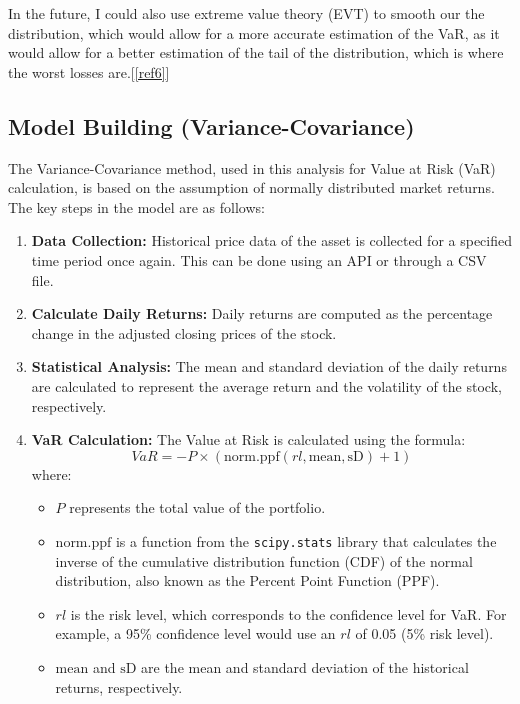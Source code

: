 \documentclass{article}
\begin{document}
In the future, I could also use extreme value theory (EVT) to smooth our the distribution, which would allow for a more accurate estimation of the VaR, as it would allow for a better estimation of the tail of the distribution, which is where the worst losses are.[\ref{ref6}]\\\vspace{0.3cm}

\subsection{Model Building (Variance-Covariance)}

The Variance-Covariance method, used in this analysis for Value at Risk (VaR) calculation, is based on the assumption of normally distributed market returns. The key steps in the model are as follows:

\begin{enumerate}
    \item \textbf{Data Collection:} Historical price data of the asset is collected for a specified time period once again. This can be done using an API or through a CSV file.
    \item \textbf{Calculate Daily Returns:} Daily returns are computed as the percentage change in the adjusted closing prices of the stock.
    \item \textbf{Statistical Analysis:} The mean and standard deviation of the daily returns are calculated to represent the average return and the volatility of the stock, respectively.
    \item \textbf{VaR Calculation:} The Value at Risk is calculated using the formula:
    \begin{equation}
      VaR = - P \times (\text{norm.ppf}(rl, \text{mean}, \text{sD}) + 1) 
      \label{eq:Variance-Covariance VaR}
    \end{equation}
    where:
\begin{itemize}
    \item \( P \) represents the total value of the portfolio.
    \item \( \text{norm.ppf} \) is a function from the \texttt{scipy.stats} library that calculates the inverse of the cumulative distribution function (CDF) of the normal distribution, also known as the Percent Point Function (PPF).
    \item \( rl \) is the risk level, which corresponds to the confidence level for VaR. For example, a 95\% confidence level would use an \( rl \) of 0.05 (5\% risk level).
    \item \( \text{mean} \) and \( \text{sD} \) are the mean and standard deviation of the historical returns, respectively.
\end{itemize}
\end{enumerate}
\end{document}
